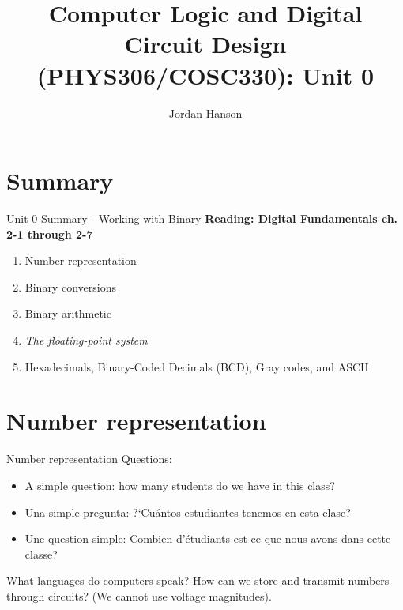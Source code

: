 \documentclass{beamer}
\title{Computer Logic and Digital Circuit Design (PHYS306/COSC330): Unit 0}
\author{Jordan Hanson}
\institute{Whittier College Department of Physics and Astronomy}
\begin{document}
\maketitle

\section{Summary}

\begin{frame}{Unit 0 Summary - Working with Binary}
\textbf{Reading: Digital Fundamentals ch. 2-1 through 2-7}
\begin{enumerate}
\item Number representation
\item Binary conversions
\item Binary arithmetic
\item \textit{The floating-point system}
\item Hexadecimals, Binary-Coded Decimals (BCD), Gray codes, and ASCII
\end{enumerate}
\end{frame}

\section{Number representation}

\begin{frame}{Number representation}
Questions:
\begin{itemize}
\item A simple question: how many students do we have in this class? \\
\item Una simple pregunta: ?`Cu\'{a}ntos estudiantes tenemos en esta clase? \\
\item Une question simple: Combien d'\'{e}tudiants est-ce que nous avons dans cette classe?
\end{itemize}
What languages do computers speak?  How can we store and transmit numbers through circuits?  (We cannot use voltage magnitudes).
\end{frame}
\end{document}
